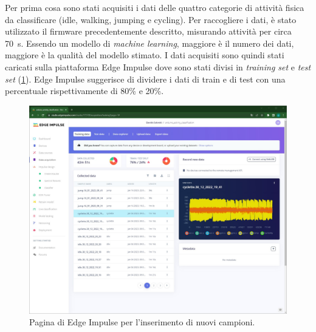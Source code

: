 Per prima cosa sono stati acquisiti i dati delle quattro categorie di attività fisica da classificare (idle, walking, jumping e cycling). Per raccogliere i dati, è stato utilizzato il firmware precedentemente descritto, misurando attività per circa \SI{70}{\second}. Essendo un modello di \textit{machine learning}, maggiore è il numero dei dati, maggiore è la qualità del modello stimato. I dati acquisiti sono quindi stati caricati sulla piattaforma Edge Impulse dove sono stati divisi in \textit{training set} e \textit{test set} (\Fig\ref{fig:acquisizione_dati}). Edge Impulse suggerisce di dividere i dati di train e di test con una percentuale rispettivamente di 80\% e 20\%.
\begin{figure}[h!]
	\centering
	\includegraphics[width=0.5\linewidth]{./ImageFiles/data_acquisition.jpg}
	\caption{Pagina di Edge Impulse per l'inserimento di nuovi campioni.}
	\label{fig:acquisizione_dati}
\end{figure}

